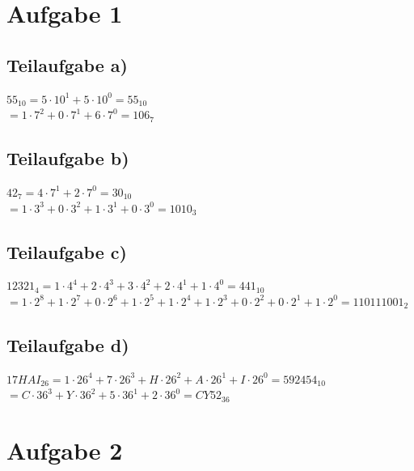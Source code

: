 \documentclass{llncs}
\begin{document}
\section*{Aufgabe 1}

\subsection*{Teilaufgabe a)}

$55_{10} = 5 \cdot 10^1 + 5 \cdot 10^0 = 55_{10}$\\
$= 1 \cdot 7^2 + 0 \cdot 7^1 + 6 \cdot 7^0 = 106_{7}$

\subsection*{Teilaufgabe b)}

$42_{7} = 4 \cdot 7^1 + 2 \cdot 7^0 = 30_{10}$\\
$= 1 \cdot 3^3 + 0 \cdot 3^2 + 1 \cdot 3^1 + 0 \cdot 3^0 = 1010_{3}$

\subsection*{Teilaufgabe c)}

$12321_{4} = 1 \cdot 4^4 + 2 \cdot 4^3 + 3 \cdot 4^2 + 2 \cdot 4^1 +1 \cdot 4^0 = 441_{10}$\\
$= 1 \cdot 2^8 + 1 \cdot 2^7 + 0 \cdot 2^6 + 1 \cdot 2^5 + 1 \cdot 2^4 + 1 \cdot 2^3 + 0 \cdot 2^2 + 0 \cdot 2^1 + 1 \cdot 2^0 = 110111001_{2}$

\subsection*{Teilaufgabe d)}

$17HAI_{26} = 1 \cdot 26^4 + 7 \cdot 26^3 + H \cdot 26^2 + A \cdot 26^1 + I \cdot 26^0 = 592454_{10}$\\
$= C \cdot 36^3 + Y \cdot 36^2 + 5 \cdot 36^1 + 2 \cdot 36^0 = CY52_{36}$

\section*{Aufgabe 2}
\end{document}

